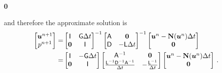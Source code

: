 \documentclass[11pt]{article}
\begin{document}
\begin{enumerate}
\begin{bmatrix*}
        \bf{0}\\
    \end{bmatrix*}\com
\eeq
and therefore the approximate solution is
\begin{align}
    \label{eq:ns_d_4}
    \begin{bmatrix*} 
        \bu^{n+1}\\
        p^{n+1}
    \end{bmatrix*} =& 
    \begin{bmatrix*} 
        \sI &  \sG \dt\\
    {\bf 0} & \sI 
    \end{bmatrix*}^{-1}
    \begin{bmatrix*} 
        \sA & \bf{0}\\
        \sD  & -\sL \dt
    \end{bmatrix*}^{-1}
    \begin{bmatrix*} 
        \bu^{n}-\bN(\bu^n)\dt\\
        \bf{0}\\
    \end{bmatrix*} \\
    = & 
     \begin{bmatrix*} 
        \sI &  -\sG \dt\\
    {\bf 0} & \sI 
    \end{bmatrix*}
     \begin{bmatrix*} 
         \sA^{-1} &  \bf{0}\\
         \frac{\sL^{-1}\sD^{-1}\sA^{-1}}{\dt} & -\frac{\sL^{-1}}{\dt} 
    \end{bmatrix*}
        \begin{bmatrix*} 
        \bu^{n}-\bN(\bu^n)\dt\\
        \bf{0}\\
    \end{bmatrix*}
    \per
\end{align}




\end{enumerate}
    


\end{document}
